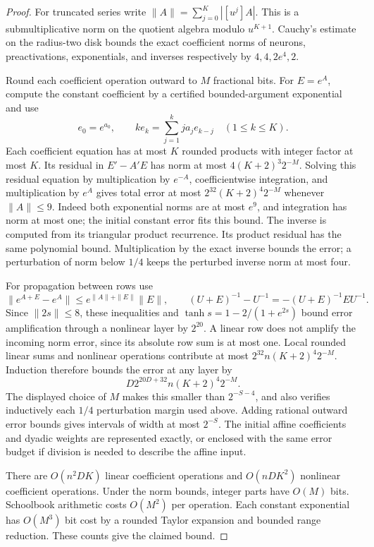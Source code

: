 \begin{proof}
For truncated series write $\|A\|=\sum_{j=0}^K|[u^j]A|$.
This is a submultiplicative norm on the quotient algebra modulo
$u^{K+1}$. Cauchy's estimate on the radius-two disk bounds the
exact coefficient norms of neurons, preactivations, exponentials,
and inverses respectively by $4,4,2e^4,2$.

Round each coefficient operation outward to $M$ fractional bits.
For $E=e^A$, compute the constant coefficient by a certified
bounded-argument exponential and use
\[
 e_0=e^{a_0},\qquad
 k e_k=\sum_{j=1}^k j a_j e_{k-j}\quad(1\le k\le K).
\]
Each coefficient equation has at most $K$ rounded products with
integer factor at most $K$. Its residual in $E'-A'E$ has norm at
most $4(K+2)^3 2^{-M}$. Solving this residual equation by
multiplication by $e^{-A}$, coefficientwise integration, and
multiplication by $e^A$ gives total error at most
$2^{32}(K+2)^4 2^{-M}$ whenever $\|A\|\le9$.
Indeed both exponential norms are at most $e^9$, and integration
has norm at most one; the initial constant error fits this bound.
The inverse is computed from its triangular product recurrence.
Its product residual has the same polynomial bound. Multiplication
by the exact inverse bounds the error; a perturbation of norm below
$1/4$ keeps the perturbed inverse norm at most four.

For propagation between rows use
\[
 \|e^{A+E}-e^A\|\le e^{\|A\|+\|E\|}\|E\|,\qquad
 (U+E)^{-1}-U^{-1}=-(U+E)^{-1}EU^{-1}.
\]
Since $\|2s\|\le8$, these inequalities and
$\tanh s=1-2/(1+e^{2s})$ bound error amplification through a
nonlinear layer by $2^{20}$. A linear row does not amplify the
incoming norm error, since its absolute row sum is at most one.
Local rounded linear sums and nonlinear operations contribute at
most $2^{32}n(K+2)^4 2^{-M}$. Induction therefore bounds the error
at any layer by
\[
 D2^{20D+32}n(K+2)^4 2^{-M}.
\]
The displayed choice of $M$ makes this smaller than $2^{-S-4}$,
and also verifies inductively each $1/4$ perturbation margin used
above. Adding rational outward error bounds gives intervals of
width at most $2^{-S}$. The initial affine coefficients and dyadic
weights are represented exactly, or enclosed with the same error
budget if division is needed to describe the affine input.

There are $O(n^2DK)$ linear coefficient operations and
$O(nDK^2)$ nonlinear coefficient operations. Under the norm bounds,
integer parts have $O(M)$ bits. Schoolbook arithmetic costs
$O(M^2)$ per operation. Each constant exponential has
$O(M^3)$ bit cost by a rounded Taylor expansion and bounded range
reduction. These counts give the claimed bound.
\end{proof}
